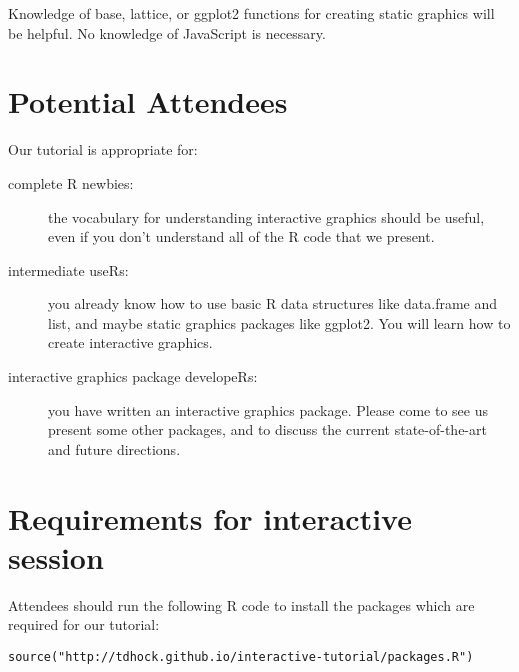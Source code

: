 \documentclass[11pt]{article}
\begin{document}
Knowledge of base, lattice, or ggplot2
functions for creating static graphics will be helpful. No
knowledge of JavaScript is necessary.

\section*{Potential Attendees}
\label{sec:orgheadline12}
Our tutorial is appropriate for:
\begin{description}
\item[complete R newbies:] the vocabulary for understanding interactive
graphics should be useful, even if you don't understand all of the R
code that we present.
\item[intermediate useRs:] you already know how to use basic R data
  structures like data.frame and list, and maybe static graphics
  packages like ggplot2. You will learn how to create interactive
  graphics.
\item[interactive graphics package developeRs:] you have written an
  interactive graphics package. Please come to see us present some
  other packages, and to discuss the current state-of-the-art and
  future directions.
\end{description}

\section*{Requirements for interactive session}

Attendees should run the following R code to install the packages
which are required for our tutorial:

\begin{verbatim}
source("http://tdhock.github.io/interactive-tutorial/packages.R")
\end{verbatim}
\end{document}
